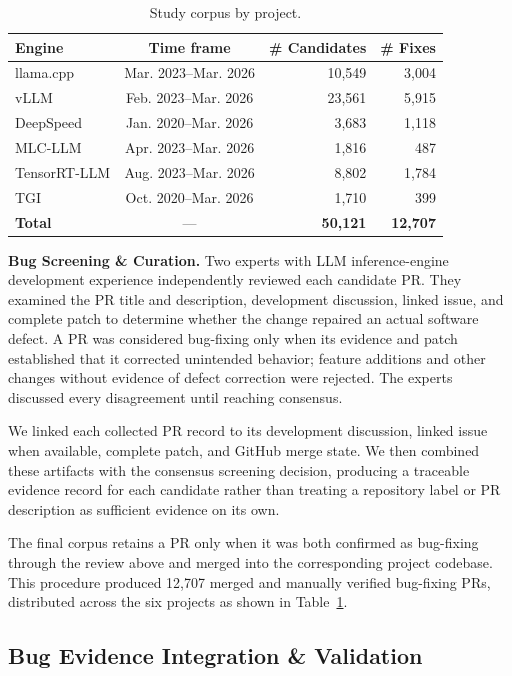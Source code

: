\begin{table}[t]
  \centering
  \caption{Study corpus by project.}
  \label{tab:bug_stats}
  \begin{tabular}{l c r r}
    \toprule
    Engine & Time frame & \# Candidates & \# Fixes \\
    \midrule
    llama.cpp    & Mar. 2023--Mar. 2026 & 10,549 & 3,004 \\
    vLLM         & Feb. 2023--Mar. 2026 & 23,561 & 5,915 \\
    DeepSpeed    & Jan. 2020--Mar. 2026 &  3,683 & 1,118 \\
    MLC-LLM      & Apr. 2023--Mar. 2026 &  1,816 &   487 \\
    TensorRT-LLM & Aug. 2023--Mar. 2026 &  8,802 & 1,784 \\
    TGI          & Oct. 2020--Mar. 2026 &  1,710 &   399 \\
    \midrule
    \textbf{Total} & --- & \textbf{50,121} & \textbf{12,707} \\
    \bottomrule
  \end{tabular}
\end{table}

\textbf{Bug Screening \& Curation.} Two experts with LLM inference-engine development experience independently reviewed each candidate PR. They examined the PR title and description, development discussion, linked issue, and complete patch to determine whether the change repaired an actual software defect. A PR was considered bug-fixing only when its evidence and patch established that it corrected unintended behavior; feature additions and other changes without evidence of defect correction were rejected. The experts discussed every disagreement until reaching consensus.

We linked each collected PR record to its development discussion, linked issue when available, complete patch, and GitHub merge state. We then combined these artifacts with the consensus screening decision, producing a traceable evidence record for each candidate rather than treating a repository label or PR description as sufficient evidence on its own.

The final corpus retains a PR only when it was both confirmed as bug-fixing through the review above and merged into the corresponding project codebase. This procedure produced 12,707 merged and manually verified bug-fixing PRs, distributed across the six projects as shown in Table~\ref{tab:bug_stats}.
\subsection{Bug Evidence Integration \& Validation}

